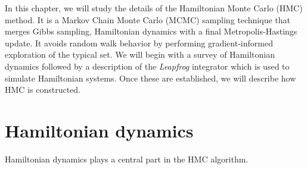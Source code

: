 In this chapter, we will study the details of the Hamiltonian Monte Carlo (HMC) method.
It is a Markov Chain Monte Carlo (MCMC) sampling technique that merges Gibbs sampling, Hamiltonian dynamics with a final Metropolis-Hastings update.
It avoids random walk behavior by performing gradient-informed exploration of the typical set. 
We will begin with a survey of Hamiltonian dynamics followed by a description of
the \textit{Leapfrog} integrator which is used to simulate Hamiltonian systems. 
Once these are established, we will describe how HMC is constructed.

\section{Hamiltonian dynamics}\label{sec:hamiltonian_dynamics}
Hamiltonian dynamics \cite{classical_mechanics} plays a central part in the HMC algorithm. 
